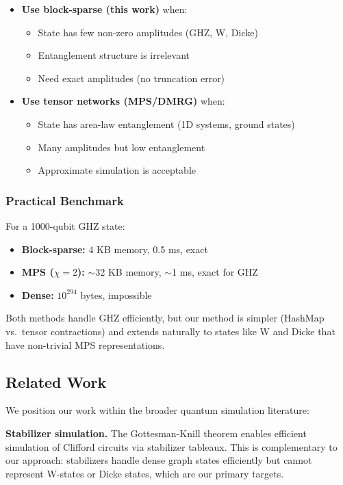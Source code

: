 \documentclass[11pt,twocolumn]{article}
\begin{document}
\begin{itemize}
    \item \textbf{Use block-sparse (this work)} when:
    \begin{itemize}
        \item State has few non-zero amplitudes (GHZ, W, Dicke)
        \item Entanglement structure is irrelevant
        \item Need exact amplitudes (no truncation error)
    \end{itemize}

    \item \textbf{Use tensor networks (MPS/DMRG)} when:
    \begin{itemize}
        \item State has area-law entanglement (1D systems, ground states)
        \item Many amplitudes but low entanglement
        \item Approximate simulation is acceptable
    \end{itemize}
\end{itemize}

\subsubsection{Practical Benchmark}

For a 1000-qubit GHZ state:
\begin{itemize}
    \item \textbf{Block-sparse:} 4 KB memory, 0.5 ms, exact
    \item \textbf{MPS ($\chi=2$):} $\sim$32 KB memory, $\sim$1 ms, exact for GHZ
    \item \textbf{Dense:} $10^{294}$ bytes, impossible
\end{itemize}

Both methods handle GHZ efficiently, but our method is simpler (HashMap vs.\ tensor contractions) and extends naturally to states like W and Dicke that have non-trivial MPS representations.

\subsection{Related Work}

We position our work within the broader quantum simulation literature:

\textbf{Stabilizer simulation.} The Gottesman-Knill theorem \cite{gottesman1998, aaronson2004} enables efficient simulation of Clifford circuits via stabilizer tableaux. This is complementary to our approach: stabilizers handle dense graph states efficiently but cannot represent W-states or Dicke states, which are our primary targets.
\end{document}
